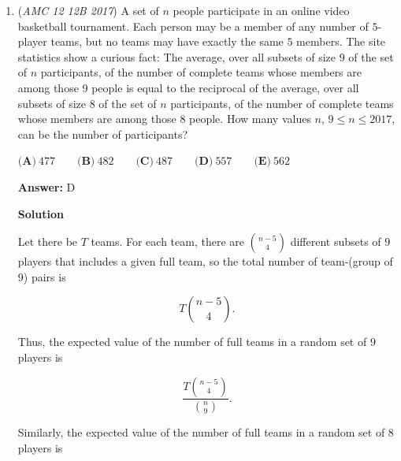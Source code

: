 \begin{enumerate}
 
Next, $\angle AFE = \frac{\pi}{2} = \angle EGD$ because $FG \parallel BC$. Also, $\pi = \angle FEA + \angle AED + \angle DEG = \angle FEA + \angle AED + \angle EAF = \frac{\pi}{2} + \angle AED$, so $\angle AED = \frac{\pi}{2}$. Therefore, $\triangle AED \sim \triangle ABC$ by AA. Since $\triangle CEB \sim \triangle ABC$, $\triangle AED \sim \triangle CEB$.

 
Given $\frac{[AED]}{[CEB]} = 17$, we deduce that the ratio of corresponding side lengths of $AED$ to $CEB$ must be $\sqrt{17}$. Now, we set $BC = 1$, $AB = x$, and $CD = \frac{1}{x}$. Using the Pythagorean Theorem, $AD = \sqrt{\Big(x-\frac{1}{x}\Big)^2 + 1^2}$. Thus, $\sqrt{17} = \frac{AD}{CB} = \frac{\sqrt{\Big(x-\frac{1}{x}\Big)^2 + 1^2}}{1}$. Solving gives $x = 2+\sqrt{5}$.

 
Finally, $\frac{AB}{BC} = \frac{2+\sqrt{5}}{1} = \boxed{\textbf{(D) } 2+\sqrt{5}}$.

 


	\item (\textit{AMC 12 12B 2017}) A set of $n$ people participate in an online video basketball tournament. Each person may be a member of any number of $5$-player teams, but no teams may have exactly the same $5$ members. The site statistics show a curious fact: The average, over all subsets of size $9$ of the set of $n$ participants, of the number of complete teams whose members are among those 9 people is equal to the reciprocal of the average, over all subsets of size $8$ of the set of $n$ participants, of the number of complete teams whose members are among those $8$ people. How many values $n$, $9 \leq n \leq 2017$, can be the number of participants?


 $\textbf{(A)}\ 477 \qquad \textbf{(B)}\ 482 \qquad \textbf{(C)}\ 487 \qquad \textbf{(D)}\ 557 \qquad\textbf{(E)}\ 562$

 \textbf{Answer: }D



\textbf{Solution}

Let there be $T$ teams. For each team, there are ${n-5\choose 4}$ different subsets of $9$ players that includes a given full team, so the total number of team-(group of 9) pairs is 

 
 \[T{n-5\choose 4}.\]

 Thus, the expected value of the number of full teams in a random set of $9$ players is

 
 \[\frac{T{n-5\choose 4}}{{n\choose 9}}.\]

 Similarly, the expected value of the number of full teams in a random set of $8$ players is


\end{enumerate}

